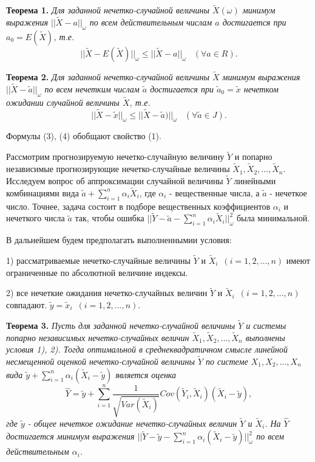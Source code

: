 \textbf{Теорема 1.} \textit{Для заданной нечетко-случайной величины $\tilde{X}(\omega)$ минимум выражения $||\tilde{X} - a||_{\omega} $ по всем действительным числам $a$ достигается при $a_0 = E(\tilde{X})$, т.е.}
\begin{equation}
||\tilde{X}-E(\tilde{X})||_{\omega}\leq ||\tilde{X}-a||_{\omega}\,\,\,\,\,(\forall a\in R).
\end{equation}

\textbf{Теорема 2. }\textit{Для заданной нечетко-случайной величины $\tilde{X}$ минимум выражения $||\tilde{X} - \tilde{a}||_{\omega}$ по всем нечетким числам $\tilde{a}$ достигается при $\tilde{a}_0 = \tilde{x}$ нечетком ожидании случайной величины $\tilde{X}$, т.е.}
\begin{equation}
||\tilde{X}-\tilde{x}||_{\omega}\leq ||\tilde{X}-\tilde{a})||_{\omega}\,\,\,\,\,(\forall \tilde{a}\in J).
\end{equation}

Формулы (3), (4) обобщают свойство (1).

Рассмотрим прогнозируемую  нечетко-случайную величину $\tilde{Y}$ и попарно независимые прогнозирующие нечетко-случайные величины $\tilde{X}_1, \tilde{X}_2,..., \tilde{X}_n$. Исследуем вопрос об аппроксимации случайной величины $\tilde{Y}$ линейными комбинациями вида $\tilde{a} + \sum\limits_{i=1}^n\alpha_i\tilde{X}_i$, где $\alpha_i$ - вещественные числа, а $ \tilde{a}$ - нечеткое число. Точнее, задача состоит в подборе вещественных коэффициентов $\alpha_i$ и нечеткого числа $\tilde{a}$ так, чтобы ошибка $||\tilde{Y} - \tilde{a}- \sum\limits_{i=1}^n\alpha_i\tilde{X}_i||_{\omega}^2$ была минимальной.

В дальнейшем будем предполагать выполненнымии условия:

1) рассматриваемые нечетко-случайные величины $\tilde{Y}$ и $\tilde{X}_i$\,\,\,$(i = 1, 2,...,n)$ имеют ограниченные по абсолютной величине индексы.

2) все нечеткие ожидания нечетко-случайных величин $\tilde{Y}$ и $\tilde{X}_i$\,\,\,$(i = 1, 2,...,n)$ совпадают. $\tilde{y} = \tilde{x}_i$\,\,\,$(i = 1, 2,..., n)$.

\textbf{Теорема 3.} \textit{Пусть для заданной нечетко-случайной величины $\tilde{Y}$ и системы попарно независимых нечетко-случайных величин $\tilde{X}_1, \tilde{X}_2,..., \tilde{X}_n$ выполнены условия 1), 2). Тогда оптимальной в среднеквадратичном смысле линейной несмещенной оценкой нечетко-случайной величины $\tilde{Y}$ по системе $X_1, X_2,..., X_n$ вида $\tilde{y}+\sum\limits_{i=1}^n\alpha_i(\tilde{X}_i - \tilde{y})$ является оценка }
\begin{equation}
\hat{Y} = \tilde{y} + \sum\limits_{i=1}^n\frac{1}{\sqrt{Var(\tilde{X}_i)}}Cov(\tilde{Y}_i, \tilde{X}_i)(\tilde{X}_i-\tilde{y}),
\end{equation}
\textit{где $\tilde{y}$ - общее нечеткое ожидание нечетко-случайных величин $\tilde{Y}$ и $\tilde{X}_i$. На $\hat{Y}$ достигается минимум выражения $||\tilde{Y} - \tilde{y} -\sum\limits_{i=1}^n\alpha_i(\tilde{X}_i-\tilde{y})||_{\omega}^2$ по всем действительным $\alpha_i$.}

